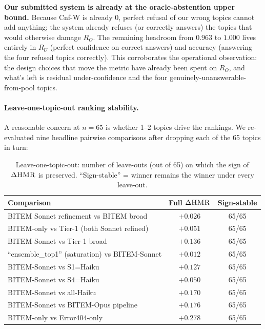 \documentclass[11pt,a4paper]{article}
\newcommand{\HMR}{\textsc{HMR}}
\begin{document}
\noindent \textbf{Our submitted system is already at the
oracle-abstention upper bound.} Because Cnf-W is already $0$, perfect
refusal of our wrong topics cannot add anything; the system already
refuses (or correctly answers) the topics that would otherwise damage
$R_O$. The remaining headroom from $0.963$ to $1.000$ lives entirely
in $R_U$ (perfect confidence on correct answers) and accuracy
(answering the four refused topics correctly). This corroborates the
operational observation: the design choices that move the metric
have already been spent on $R_O$, and what's left is residual
under-confidence and the four genuinely-unanswerable-from-pool topics.

\paragraph{Leave-one-topic-out ranking stability.}
A reasonable concern at $n=65$ is whether 1--2 topics drive the
rankings. We re-evaluated nine headline pairwise comparisons after
dropping each of the 65 topics in turn:

\begin{table}[h]
\centering
\caption{Leave-one-topic-out: number of leave-outs (out of 65) on
which the sign of $\Delta\HMR$ is preserved. ``Sign-stable'' = winner
remains the winner under every leave-out.}
\label{tab:loo_stability}
\small
\begin{tabular}{lcc}
\toprule
Comparison & Full $\Delta\HMR$ & Sign-stable \\
\midrule
BITEM Sonnet refinement vs BITEM broad      & $+0.026$ & 65/65 \\
BITEM-only vs Tier-1 (both Sonnet refined)  & $+0.051$ & 65/65 \\
BITEM-Sonnet vs Tier-1 broad                & $+0.136$ & 65/65 \\
``ensemble\_top1'' (saturation) vs BITEM-Sonnet & $+0.012$ & 65/65 \\
BITEM-Sonnet vs S1=Haiku                    & $+0.127$ & 65/65 \\
BITEM-Sonnet vs S4=Haiku                    & $+0.050$ & 65/65 \\
BITEM-Sonnet vs all-Haiku                   & $+0.170$ & 65/65 \\
BITEM-Sonnet vs BITEM-Opus pipeline         & $+0.176$ & 65/65 \\
BITEM-only vs Error404-only                 & $+0.278$ & 65/65 \\
\bottomrule
\end{tabular}
\end{table}
\end{document}
